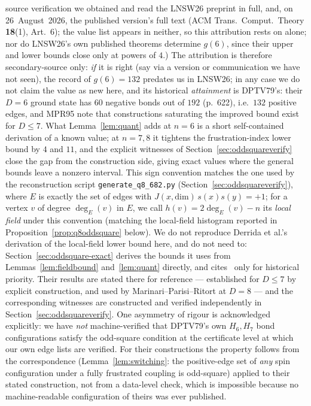 \documentclass[12pt]{article}
\begin{document}
source verification we obtained and read the LNSW26 preprint in full, and,
on 26~August~2026, the published version's full text (ACM
Trans.\ Comput.\ Theory \textbf{18}(1), Art.~6); the value list appears in
neither, so this attribution rests on \cite{Emlek26} alone; nor do
LNSW26's own published theorems determine $g(6)$, since their upper and
lower bounds close only at powers of $4$.) The attribution is therefore
secondary-source only: \emph{if} it is right (say via a version or
communication we have not seen), the record of $g(6)=132$ predates us in
LNSW26; in any case we do not claim the value as new here, and its
historical \emph{attainment} is DPTV79's: their $D=6$ ground state has $60$ negative bonds out of $192$
(p.~622), i.e.\ $132$ positive edges, and MPR95 note that constructions
saturating the improved bound exist for $D\le7$. What
Lemma~\ref{lem:quant} adds at $n=6$ is a short self-contained derivation of a
known value; at $n=7,8$ it tightens the frustration-index lower bound by $4$
and $11$, and the explicit witnesses of
Section~\ref{sec:oddsquareverify} close the gap from the construction side,
giving exact values where the general bounds leave a nonzero interval. This sign convention matches the one used by the reconstruction
script \texttt{generate\_q8\_682.py} (Section~\ref{sec:oddsquareverify}),
where $E$ is exactly the set of edges with $J(x,\mathrm{dim})\,s(x)s(y)=+1$;
for a vertex $v$ of degree $\deg_E(v)$ in $E$, we call
$h(v)=2\deg_E(v)-n$ its \emph{local field} under this convention (matching
the local-field histogram reported in Proposition~\ref{prop:q8oddsquare}
below). We do not reproduce Derrida et al.'s derivation of the local-field
lower bound here, and do not need to: Section~\ref{sec:oddsquare-exact}
derives the bounds it uses from Lemmas~\ref{lem:fieldbound}
and~\ref{lem:quant} directly, and cites~\cite{DPTV79,MPR95} only for
historical priority. Their results are stated there for reference ---
established for $D\le7$ by explicit construction, and used by
Marinari--Parisi--Ritort at $D=8$ --- and the corresponding witnesses
are constructed and verified independently in
Section~\ref{sec:oddsquareverify}. One asymmetry of rigour is acknowledged
explicitly: we have \emph{not} machine-verified that DPTV79's own $H_6,H_7$
bond configurations satisfy the odd-square condition at the certificate level
at which our own edge lists are verified. For their constructions the property
follows from the correspondence (Lemma~\ref{lem:switching}: the positive-edge
set of \emph{any} spin configuration under a fully frustrated coupling is
odd-square) applied to their stated construction, not from a data-level check,
which is impossible because no machine-readable configuration of theirs was
ever published.
\end{document}
